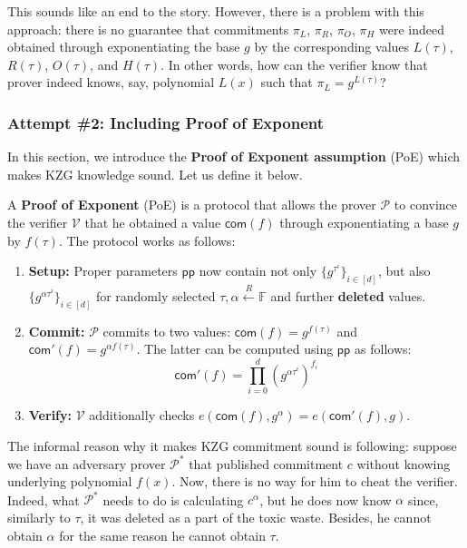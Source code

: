 \documentclass[../lecture-notes.tex]{subfiles}
\begin{document}
This sounds like an end to the story. However, there is a problem with this approach: there is no guarantee that commitments $\pi_L$, $\pi_R$, $\pi_O$, $\pi_H$ were indeed obtained through exponentiating the base $g$ by the corresponding values $L(\tau)$, $R(\tau)$, $O(\tau)$, and $H(\tau)$. In other words, how can the verifier know that prover indeed knows, say, polynomial $L(x)$ such that $\pi_L = g^{L(\tau)}$?

\subsubsection{Attempt \#2: Including Proof of Exponent}

In this section, we introduce the \textbf{Proof of Exponent assumption} (PoE) which makes KZG knowledge sound. Let us define it below.

\begin{definition}
    A \textbf{Proof of Exponent} (PoE) is a protocol that allows the prover $\mathcal{P}$ to convince the verifier $\mathcal{V}$ that he obtained a value $\mathsf{com}(f)$ through exponentiating a base $g$ by $f(\tau)$. The protocol works as follows:
    \begin{enumerate}
        \item \textbf{Setup:} Proper parameters $\mathsf{pp}$ now contain not only $\{g^{\tau^i}\}_{i \in [d]}$, but also $\{g^{\alpha\tau^i}\}_{i \in [d]}$ for randomly selected $\tau,\alpha \xleftarrow{R} \mathbb{F}$ and further \textbf{deleted} values.
        \item \textbf{Commit:} $\mathcal{P}$ commits to two values: $\mathsf{com}(f) = g^{f(\tau)}$ and $\mathsf{com}'(f) = g^{\alpha f(\tau)}$. The latter can be computed using $\mathsf{pp}$ as follows:
        \begin{equation*}
            \mathsf{com}'(f) = \prod_{i=0}^d (g^{\alpha\tau^i})^{f_i}
        \end{equation*} 
        \item \textbf{Verify:} $\mathcal{V}$ additionally checks $e(\mathsf{com}(f),g^{\alpha}) = e(\mathsf{com}'(f), g)$.
    \end{enumerate}
\end{definition}

The informal reason why it makes KZG commitment sound is following: suppose we have an adversary prover $\mathcal{P}^*$ that published commitment $c$ without knowing underlying polynomial $f(x)$. Now, there is no way for him to cheat the verifier. 
Indeed, what $\mathcal{P}^*$ needs to do is calculating $c^{\alpha}$, but he does now know $\alpha$ since, similarly to $\tau$, it was deleted as a part of the toxic waste. Besides, he cannot obtain $\alpha$ for the same reason he cannot obtain $\tau$.
\end{document}
